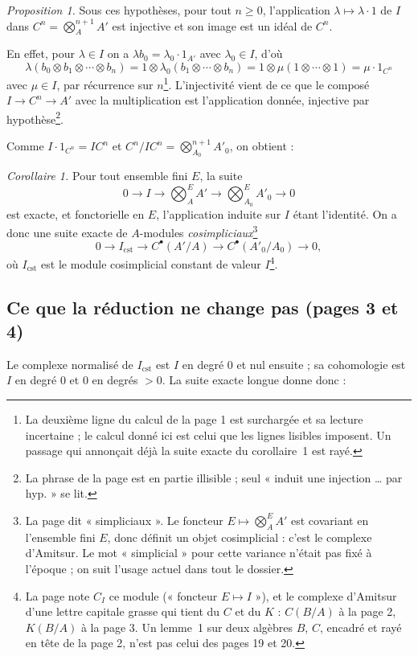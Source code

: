 \documentclass[11pt,a4paper]{article}
\begin{document}
\emph{Proposition 1.} Sous ces hypothèses, pour tout $n \geqslant 0$,
l'application $\lambda \mapsto \lambda \cdot 1$ de $I$ dans $C^n =
\bigotimes^{n+1}_A A'$ est injective et son image est un idéal de $C^n$.

En effet, pour $\lambda \in I$ on a $\lambda b_0 = \lambda_0 \cdot 1_{A'}$
avec $\lambda_0 \in I$, d'où
\[
  \lambda (b_0 \otimes b_1 \otimes \cdots \otimes b_n)
  = 1 \otimes \lambda_0 (b_1 \otimes \cdots \otimes b_n)
  = 1 \otimes \mu (1 \otimes \cdots \otimes 1)
  = \mu \cdot 1_{C^n}
\]
avec $\mu \in I$, par récurrence sur $n$\footnote{La deuxième ligne du calcul
de la page 1 est surchargée et sa lecture incertaine ; le calcul donné ici est
celui que les lignes lisibles imposent. Un passage qui annonçait déjà la suite
exacte du corollaire~1 est rayé.}. L'injectivité vient de ce que le composé
$I \to C^n \to A'$ avec la multiplication est l'application donnée, injective
par hypothèse\footnote{La phrase de la page est en partie illisible ; seul
« induit une injection … par hyp. » se lit.}.

Comme $I \cdot 1_{C^n} = IC^n$ et $C^n / IC^n = \bigotimes^{n+1}_{A_0}
A'_0$, on obtient :

\emph{Corollaire 1.} Pour tout ensemble fini $E$, la suite
\[
  0 \to I \to \bigotimes^E_A A' \to \bigotimes^E_{A_0} A'_0 \to 0
\]
est exacte, et fonctorielle en $E$, l'application induite sur $I$ étant
l'identité. On a donc une suite exacte de $A$-modules
\emph{cosimpliciaux}\footnote{La page dit « simpliciaux ». Le foncteur $E
\mapsto \bigotimes^E_A A'$ est covariant en l'ensemble fini $E$, donc définit
un objet cosimplicial : c'est le complexe d'Amitsur. Le mot « simplicial »
pour cette variance n'était pas fixé à l'époque ; on suit l'usage actuel
dans tout le dossier.}
\[
  0 \to I_{\mathrm{cst}} \to C^{\bullet}(A'/A) \to C^{\bullet}(A'_0/A_0) \to 0 ,
\]
où $I_{\mathrm{cst}}$ est le module cosimplicial constant de valeur
$I$\footnote{La page note $C_I$ ce module (« foncteur $E \mapsto I$ »), et
le complexe d'Amitsur d'une lettre capitale grasse qui tient du $C$ et du
$K$ : $C(B/A)$ à la page 2, $K(B/A)$ à la page 3. Un lemme~1 sur deux
algèbres $B$, $C$, encadré et rayé en tête de la page 2, n'est pas celui des
pages 19 et 20.}.

\subsection*{Ce que la réduction ne change pas (pages 3 et 4)}

Le complexe normalisé de $I_{\mathrm{cst}}$ est $I$ en degré $0$ et nul
ensuite ; sa cohomologie est $I$ en degré $0$ et $0$ en degrés $> 0$. La
suite exacte longue donne donc :
\end{document}
